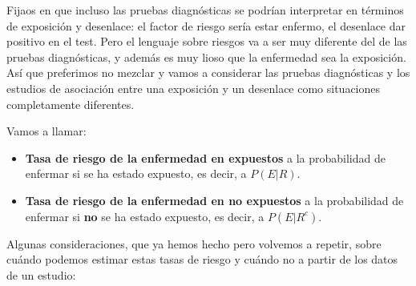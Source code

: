 \documentclass[
]{book}
\theoremstyle{definition}
\theoremstyle{definition}
\theoremstyle{definition}
\theoremstyle{definition}
\theoremstyle{remark}
\begin{document}
\begin{rmdnote}
Fijaos en que incluso las pruebas diagnósticas se podrían interpretar en términos de exposición y desenlace: el factor de riesgo sería estar enfermo, el desenlace dar positivo en el test. Pero el lenguaje sobre riesgos va a ser muy diferente del de las pruebas diagnósticas, y además es muy lioso que la enfermedad sea la exposición. Así que preferimos no mezclar y vamos a considerar las pruebas diagnósticas y los estudios de asociación entre una exposición y un desenlace como situaciones completamente diferentes.
\end{rmdnote}

Vamos a llamar:

\begin{itemize}
\item
  \textbf{Tasa de riesgo de la enfermedad en expuestos} a la probabilidad de enfermar si se ha estado expuesto, es decir, a \(P(E|R)\).
\item
  \textbf{Tasa de riesgo de la enfermedad en no expuestos} a la probabilidad de enfermar si \textbf{no} se ha estado expuesto, es decir, a \(P(E|R^c)\).
\end{itemize}

Algunas consideraciones, que ya hemos hecho pero volvemos a repetir, sobre cuándo podemos estimar estas tasas de riesgo y cuándo no a partir de los datos de un estudio:
\end{document}
